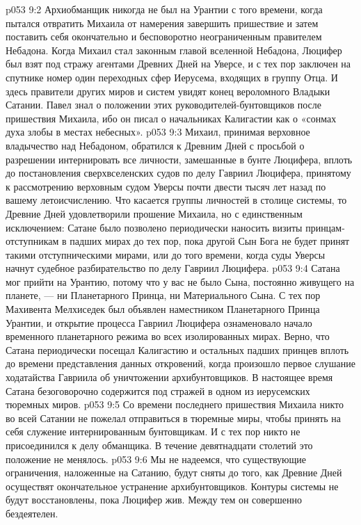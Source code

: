 \vs p053 9:2 \pc Архиобманщик никогда не был на Урантии с того времени, когда пытался отвратить Михаила от намерения завершить пришествие и затем поставить себя окончательно и бесповоротно неограниченным правителем Небадона. Когда Михаил стал законным главой вселенной Небадона, Люцифер был взят под стражу агентами Древних Дней на Уверсе, и с тех пор заключен на спутнике номер один переходных сфер Иерусема, входящих в группу Отца. И здесь правители других миров и систем увидят конец вероломного Владыки Сатании. Павел знал о положении этих руководителей\hyp{}бунтовщиков после пришествия Михаила, ибо он писал о начальниках Калигастии как о «сонмах духа злобы в местах небесных».
\vs p053 9:3 \pc Михаил, принимая верховное владычество над Небадоном, обратился к Древним Дней с просьбой о разрешении интернировать все личности, замешанные в бунте Люцифера, вплоть до постановления сверхвселенских судов по делу Гавриил  Люцифера, принятому к рассмотрению верховным судом Уверсы почти двести тысяч лет назад по вашему летоисчислению. Что касается группы личностей в столице системы, то Древние Дней удовлетворили прошение Михаила, но с единственным исключением: Сатане было позволено периодически наносить визиты принцам\hyp{}отступникам в падших мирах до тех пор, пока другой Сын Бога не будет принят такими отступническими мирами, или до того времени, когда суды Уверсы начнут судебное разбирательство по делу Гавриил  Люцифера.
\vs p053 9:4 Сатана мог прийти на Урантию, потому что у вас не было Сына, постоянно живущего на планете, --- ни Планетарного Принца, ни Материального Сына. С тех пор Махивента Мелхиседек был объявлен наместником Планетарного Принца Урантии, и открытие процесса Гавриил  Люцифера ознаменовало начало временного планетарного режима во всех изолированных мирах. Верно, что Сатана периодически посещал Калигастию и остальных падших принцев вплоть до времени представления данных откровений, когда произошло первое слушание ходатайства Гавриила об уничтожении архибунтовщиков. В настоящее время Сатана безоговорочно содержится под стражей в одном из иерусемских тюремных миров.
\vs p053 9:5 \pc Со времени последнего пришествия Михаила никто во всей Сатании не пожелал отправиться в тюремные миры, чтобы принять на себя служение интернированным бунтовщикам. И с тех пор никто не присоединился к делу обманщика. В течение девятнадцати столетий это положение не менялось.
\vs p053 9:6 Мы не надеемся, что существующие ограничения, наложенные на Сатанию, будут сняты до того, как Древние Дней осуществят окончательное устранение архибунтовщиков. Контуры системы не будут восстановлены, пока Люцифер жив. Между тем он совершенно бездеятелен.
